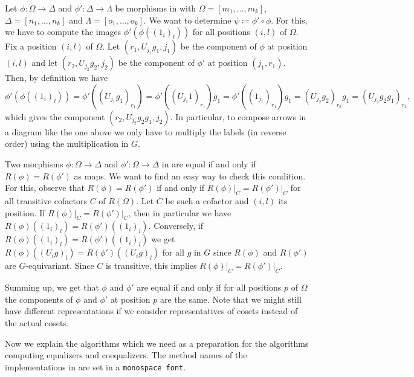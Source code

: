 \begin{rem}\label{rem:composition_of_G_morphisms}
Let $\phi\colon \Omega \to \Delta$ and $\phi'\colon \Delta \to \Lambda$ be morphisms in \SkeletalGSets{} with $\Omega = [m_1,\dots,m_k]$, $\Delta = [n_1,\dots,n_k]$ and $\Lambda = [o_1,\dots,o_k]$. We want to determine $\psi \coloneqq \phi' \circ \phi$. For this, we have to compute the images $\phi'(\phi((1_i)_l))$ for all positions $(i,l)$ of $\Omega$. Fix a position $(i,l)$ of $\Omega$. Let $(r_1,U_{j_1}g_1,j_1)$ be the component of $\phi$ at position $(i,l)$ and let $(r_2,U_{j_2}g_2,j_2)$ be the component of $\phi'$ at position $(j_1,r_1)$. Then, by definition we have \[\phi'(\phi((1_i)_l)) = \phi'((U_{j_1}g_1)_{r_1}) = \phi'((U_{j_1}1)_{r_1})g_1 = \phi'((1_{j_1})_{r_1})g_1 = (U_{j_2}g_2)_{r_2}g_1 = (U_{j_2}g_2g_1)_{r_2},\] which gives the component $(r_2,U_{j_2}g_2g_1,j_2)$. In particular, to compose arrows in a diagram like the one above we only have to multiply the labels (in reverse order) using the multiplication in $G$.
\end{rem}

\begin{rem}\label{rem:equality_of_morphisms_in_skeletal_G_sets}
Two morphisms $\phi\colon \Omega \to \Delta$ and $\phi'\colon \Omega \to \Delta$ in \SkeletalGSets{} are equal if and only if $R(\phi) = R(\phi')$ as maps. We want to find an easy way to check this condition. For this, observe that $R(\phi) = R(\phi')$ if and only if $R(\phi)\vert_C = R(\phi')\vert_C$ for all transitive cofactors $C$ of $R(\Omega)$. Let $C$ be such a cofactor and $(i,l)$ its position. If $R(\phi)\vert_C = R(\phi')\vert_C$, then in particular we have $R(\phi)((1_i)_l) = R(\phi')((1_i)_l)$. Conversely, if $R(\phi)((1_i)_l) = R(\phi')((1_i)_l)$ we get $R(\phi)((U_ig)_l) = R(\phi')((U_ig)_l)$ for all $g$ in $G$ since $R(\phi)$ and $R(\phi')$ are $G$-equivariant. Since $C$ is transitive, this implies $R(\phi)\vert_C = R(\phi')\vert_C$.

Summing up, we get that $\phi$ and $\phi'$ are equal if and only if for all positions $p$ of $\Omega$ the components of $\phi$ and $\phi'$ at position $p$ are the same. Note that we might still have different representations if we consider representatives of cosets instead of the actual cosets.
\end{rem}

Now we explain the algorithms which we need as a preparation for the algorithms computing equalizers and coequalizers. The method names of the implementations in \CapPkg{} are set in a \texttt{monospace font}.

